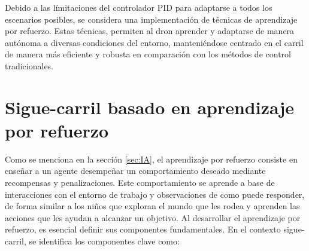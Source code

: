 Debido a las límitaciones del controlador PID para adaptarse a todos los escenarios posibles, se considera una implementación de técnicas de aprendizaje por refuerzo. Estas técnicas, 
permiten al dron aprender y adaptarse de manera autónoma a diversas condiciones del entorno, manteniéndose centrado en el carril de manera más eficiente y robusta en comparación 
con los métodos de control tradicionales.

  \section{Sigue-carril basado en aprendizaje por refuerzo}
  \label{sec:aprendizaje por refuerzo}

  Como se menciona en la sección \ref{sec:IA}, el aprendizaje por refuerzo consiste en enseñar a un agente 
  desempeñar un comportamiento deseado mediante recompensas y penalizaciones. Este comportamiento se aprende a base de interacciones con el entorno de trabajo y observaciones de como puede responder,
  de forma similar a los niños que exploran el mundo que les rodea y aprenden las acciones que les ayudan a alcanzar un objetivo. Al desarrollar el aprendizaje por refuerzo, es esencial 
  definir sus componentes fundamentales. En el contexto sigue-carril, se identifica los componentes clave como: 
